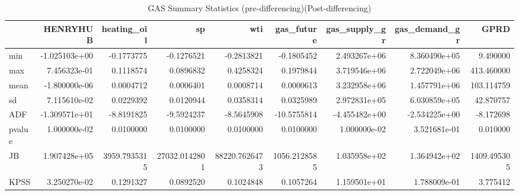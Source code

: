 \begin{table}
\centering
\caption{GAS Summary Statistics (pre-differencing)(Post-differencing)}
\centering
\begin{tabular}[t]{l|r|r|r|r|r|r|r|r}
\hline
  & HENRYHUB & heating\_oil & sp & wti & gas\_future & gas\_supply\_gr & gas\_demand\_gr & GPRD\\
\hline
min & -1.025103e+00 & -0.1773775 & -0.1276521 & -0.2813821 & -0.1805452 & 2.493267e+06 & 8.360490e+05 & 9.490000\\
\hline
max & 7.456323e-01 & 0.1118574 & 0.0896832 & 0.4258324 & 0.1979844 & 3.719546e+06 & 2.722049e+06 & 413.460000\\
\hline
mean & -1.800000e-06 & 0.0004712 & 0.0006401 & 0.0008714 & 0.0000613 & 3.232958e+06 & 1.457791e+06 & 103.114759\\
\hline
sd & 7.115610e-02 & 0.0229392 & 0.0120944 & 0.0358314 & 0.0325989 & 2.972831e+05 & 6.030859e+05 & 42.870757\\
\hline
ADF & -1.309571e+01 & -8.8191825 & -9.5924237 & -8.5645908 & -10.5755814 & -4.455482e+00 & -2.534225e+00 & -8.172698\\
\hline
pvalue & 1.000000e-02 & 0.0100000 & 0.0100000 & 0.0100000 & 0.0100000 & 1.000000e-02 & 3.521681e-01 & 0.010000\\
\hline
JB & 1.907428e+05 & 3959.7935315 & 27032.0142801 & 88220.7626473 & 1056.2128585 & 1.035958e+02 & 1.364942e+02 & 1409.495305\\
\hline
KPSS & 3.250270e-02 & 0.1291327 & 0.0892520 & 0.1024848 & 0.1057264 & 1.159501e+01 & 1.788009e-01 & 3.775412\\
\hline
\end{tabular}
\end{table}
